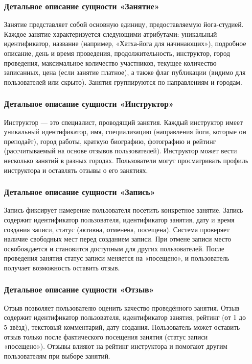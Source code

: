 \subsubsection{Детальное описание сущности «Занятие»}

Занятие представляет собой основную единицу, предоставляемую йога-студией. Каждое занятие характеризуется следующими атрибутами: уникальный идентификатор, название (например, «Хатха-йога для начинающих»), подробное описание, день и время проведения, продолжительность, инструктор, город проведения, максимальное количество участников, текущее количество записанных, цена (если занятие платное), а также флаг публикации (видимо для пользователей или скрыто). Занятия группируются по направлениям и городам.

\subsubsection{Детальное описание сущности «Инструктор»}

Инструктор — это специалист, проводящий занятия. Каждый инструктор имеет уникальный идентификатор, имя, специализацию (направления йоги, которые он преподаёт), город работы, краткую биографию, фотографию и рейтинг (рассчитываемый на основе отзывов пользователей). Инструктор может вести несколько занятий в разных городах. Пользователи могут просматривать профиль инструктора и оставлять отзывы о его занятиях.

\subsubsection{Детальное описание сущности «Запись»}

Запись фиксирует намерение пользователя посетить конкретное занятие. Запись содержит идентификатор пользователя, идентификатор занятия, дату и время создания записи, статус (активна, отменена, посещена). Система проверяет наличие свободных мест перед созданием записи. При отмене записи место освобождается и становится доступным для других пользователей. После проведения занятия статус записи меняется на «посещено», и пользователь получает возможность оставить отзыв.

\subsubsection{Детальное описание сущности «Отзыв»}

Отзыв позволяет пользователю оценить качество проведённого занятия. Отзыв содержит идентификатор пользователя, идентификатор занятия, рейтинг (от 1 до 5 звёзд), текстовый комментарий, дату создания. Пользователь может оставить отзыв только после фактического посещения занятия (статус записи «посещено»). Отзывы влияют на рейтинг инструктора и помогают другим пользователям при выборе занятий.

